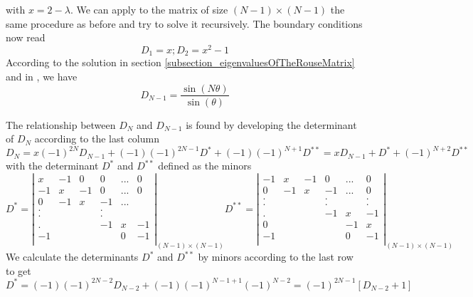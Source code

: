 \documentclass{report}
\begin{document}
with $x=2-\lambda$. We can apply to the matrix of size $(N-1)\times (N-1)$ the same procedure as before and try to solve it recursively. The boundary conditions now read
\begin{equation*}
D_1 = x; D_2 = x^2-1
\end{equation*}
According to the solution in section \ref{subsection_eigenvaluesOfTheRouseMatrix} and in \cite{lin2011polymer}, we have 
\begin{equation*}
D_{N-1}= \frac{\sin(N\theta)}{\sin(\theta)}
\end{equation*}

The relationship between $D_N$ and $D_{N-1}$ is found by developing the determinant of $D_N$ according to the last column
\begin{equation*}
D_N = x(-1)^{2N}D_{N-1}+(-1)(-1)^{2N-1}D^*+(-1)(-1)^{N+1}D^{**}=xD_{N-1}+D^*+(-1)^{N+2}D^{**}
\end{equation*}
with the determinant $D^*$ and $D^{**}$ defined as the minors 
\begin{equation*}
D^*= 
\left| \begin{matrix}
 x  & -1 &  0 &  0  &... &  0 \\
-1  &  x & -1 &  0  &... &  0 \\
 0  & -1 &  x & -1  &... &    \\
 .  &    &    &  .  &    &    \\
 .  &    &    &  .  &    &    \\
 .  &    &    &  -1 &  x &-1  \\
 -1 &    &    &     &  0 &-1  \\   
\end{matrix}\right|_{(N-1)\times(N-1)} 
D^{**}=\left|\begin{matrix}
-1  &  x & -1 &  0  &...&  0 \\
 0  & -1 &  x & -1  &...&  0 \\
 .  &    &    &  .  &   &  . \\
 .  &    &    &  .  &   &  . \\
 .  &    &    &  -1 &  x& -1 \\
 0  &    &    &     & -1& x  \\
 -1 &    &    &     &  0&-1  \\   
\end{matrix} \right|_{(N-1)\times(N-1)}
\end{equation*}
We calculate the determinants $D^*$ and $D^{**}$ by minors according to the last row to get 
\begin{equation*}
D^* = (-1)(-1)^{2N-2}D_{N-2}+(-1)(-1)^{N-1+1}(-1)^{N-2}=(-1)^{2N-1}[D_{N-2}+1]
\end{equation*}
\end{document}
